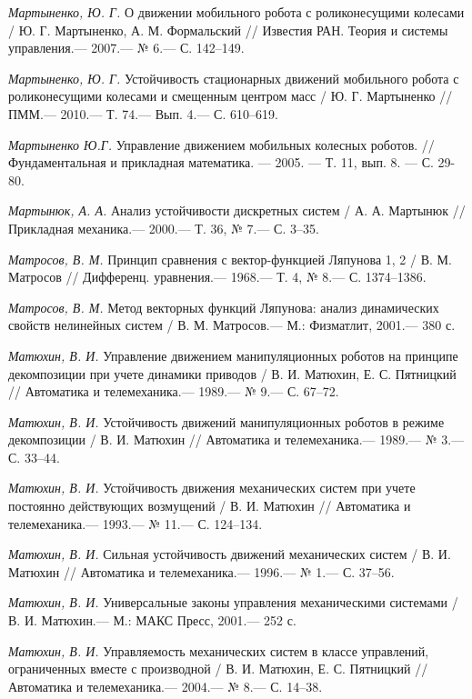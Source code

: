 \begin{thebibliography}{10}
	{\it Мартыненко, Ю. Г.} О движении мобильного робота с роликонесущими колесами / Ю. Г. Мартыненко, А. М. Формальский  //
	Известия РАН. Теория и системы управления.— 2007.— № 6.— С. 142–149.
	
	
	{\it Мартыненко, Ю. Г.} Устойчивость стационарных движений мобильного робота с роликонесущими колесами и смещенным центром масс / Ю. Г. Мартыненко //
	ПММ.— 2010.— Т. 74.— Вып. 4.— С. 610–619.
	
	{\it Мартыненко Ю.Г.} Управление движением мобильных колесных роботов. // Фундаментальная и прикладная математика. — 2005. — Т. 11, вып. 8. — С. 29-80.
	
	
	{\it Мартынюк, А. А.} Анализ устойчивости дискретных систем / А. А. Мартынюк
	// Прикладная механика.— 2000.— Т. 36, № 7.— С. 3–35.
	
	{\it Матросов, В. М.} Принцип сравнения с вектор-функцией Ляпунова 1, 2 / В. М. Матросов
	// Дифференц. уравнения.— 1968.— Т. 4, № 8.— С. 1374–1386.
	
	{\it Матросов, В. М.} Метод векторных функций Ляпунова: анализ динамических свойств нелинейных систем / В. М. Матросов.— М.: Физматлит, 2001.— 380 с.
	
	{\it Матюхин, В. И.} Управление движением манипуляционных роботов на принципе декомпозиции при учете динамики приводов
	/ В. И. Матюхин, Е. С. Пятницкий // Автоматика и телемеханика.— 1989.— № 9.— С. 67–72.
	
	{\it Матюхин, В. И.} Устойчивость движений манипуляционных роботов в режиме декомпозиции
	/ В. И. Матюхин // Автоматика и телемеханика.— 1989.— № 3.— С. 33–44.
	
	{\it Матюхин, В. И.} Устойчивость движения механических систем при учете постоянно действующих возмущений
	/ В. И. Матюхин // Автоматика и телемеханика.— 1993.— № 11.— С. 124–134.
	
	{\it Матюхин, В. И.} Сильная устойчивость движений механических систем
	/ В. И. Матюхин // Автоматика и телемеханика.— 1996.— № 1.— С. 37–56.
	
	{\it Матюхин, В. И.} Универсальные законы управления механическими системами /
	В. И. Матюхин.— М.: МАКС Пресс, 2001.— 252 с.
	
	{\it Матюхин, В. И.} Управляемость механических систем в классе управлений, ограниченных вместе с производной
	/ В. И. Матюхин, Е. С. Пятницкий // Автоматика и телемеханика.— 2004.— № 8.— С. 14–38.
	

\end{thebibliography}

